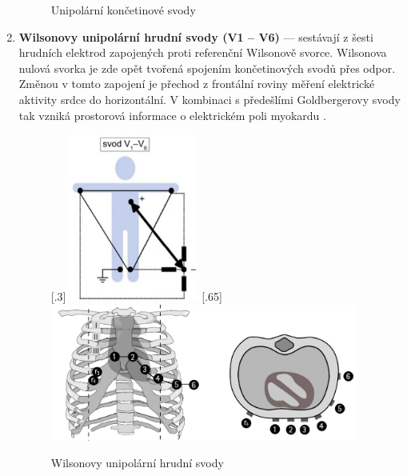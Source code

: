 \begin{enumerate}
\begin{figure}[h]
\begin{center}
			      \caption{Unipolární končetinové svody \cite{Kittnar2020}}
			      \label{img:unipolar1}
		      \end{center}
	      \end{figure}
	\item \textbf{Wilsonovy unipolární hrudní svody (V1 -- V6)} --- sestávají z
	      šesti hrudních elektrod zapojených proti referenční Wilsonově svorce.
	      Wilsonova nulová svorka je zde opět tvořená spojením končetinových
	      svodů přes odpor. Změnou v tomto zapojení je přechod z frontální
	      roviny měření elektrické aktivity srdce do horizontální. V kombinaci s
	      předešlími Goldbergerovy svody tak vzniká prostorová informace o
	      elektrickém poli myokardu \cite{Kittnar2020}.
	      \begin{figure}[h]
		      \centering
		      [.3\linewidth]{\includegraphics[height=5.5cm]{../assets/anatomy/unipolar2}}
		      \hfill
		      [.65\linewidth]{\includegraphics[height=4.5cm]{../assets/anatomy/unipolar3}}
		      \caption{Wilsonovy unipolární hrudní svody}
		      \label{fig:wilson}
	      \end{figure}
\end{enumerate}

